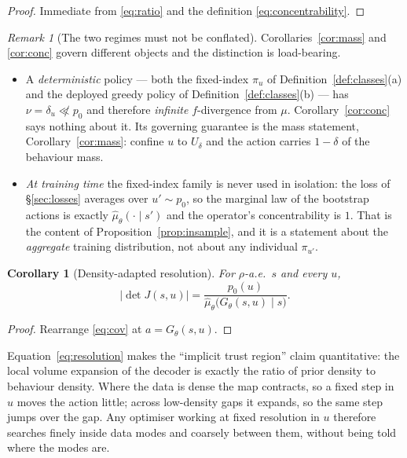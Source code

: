 \documentclass[11pt]{article}
\theoremstyle{plain}
\newtheorem{corollary}[lemma]{Corollary}
\theoremstyle{definition}
\theoremstyle{remark}
\newtheorem{remark}[lemma]{Remark}
\newcommand{\1}{\mathbf 1}
\newcommand{\Gth}{G_\theta}
\newcommand{\muhat}{\hat\mu_\theta}
\newcommand{\Udelta}{U_\delta}
\begin{document}
\begin{proof}
Immediate from \eqref{eq:ratio} and the definition \eqref{eq:concentrability}.
\end{proof}

\begin{remark}[The two regimes must not be conflated]
\label{rem:two-regimes}
Corollaries~\ref{cor:mass} and \ref{cor:conc} govern different objects and the distinction
is load-bearing.
\begin{itemize}
\item A \emph{deterministic} policy --- both the fixed-index $\pi_u$ of
  Definition~\ref{def:classes}(a) and the deployed greedy policy of
  Definition~\ref{def:classes}(b) --- has $\nu=\delta_u\not\ll p_0$ and therefore
  \emph{infinite} $f$-divergence from $\mu$. Corollary~\ref{cor:conc} says nothing about
  it. Its governing guarantee is the mass statement, Corollary~\ref{cor:mass}: confine
  $u$ to $\Udelta$ and the action carries $1-\delta$ of the behaviour mass.
\item \emph{At training time} the fixed-index family is never used in isolation: the loss
  of \S\ref{sec:losses} averages over $u'\sim p_0$, so the marginal law of the bootstrap
  actions is exactly $\muhat(\cdot\mid s')$ and the operator's concentrability is $1$.
  That is the content of Proposition~\ref{prop:insample}, and it is a statement about the
  \emph{aggregate} training distribution, not about any individual $\pi_{u'}$.
\end{itemize}
\end{remark}

\begin{corollary}[Density-adapted resolution]
\label{cor:resolution}
For $\rho$-a.e.\ $s$ and every $u$,
\begin{equation}
\label{eq:resolution}
  \big|\det J(s,u)\big|=\frac{p_0(u)}{\muhat\big(\Gth(s,u)\mid s\big)} .
\end{equation}
\end{corollary}

\begin{proof}
Rearrange \eqref{eq:cov} at $a=\Gth(s,u)$.
\end{proof}

\noindent
Equation~\eqref{eq:resolution} makes the ``implicit trust region'' claim quantitative: the
local volume expansion of the decoder is exactly the ratio of prior density to behaviour
density. Where the data is dense the map contracts, so a fixed step in $u$ moves the
action little; across low-density gaps it expands, so the same step jumps over the gap.
Any optimiser working at fixed resolution in $u$ therefore searches finely inside data
modes and coarsely between them, without being told where the modes are.
\end{document}
